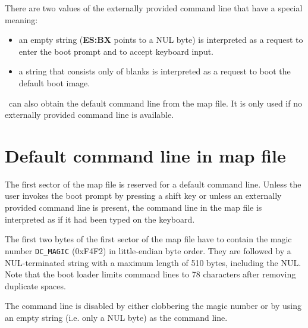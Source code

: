 There are two values of the externally provided command line that have a
special meaning:

\begin{itemize}
  \item an empty string ({\bf ES:BX} points to a NUL byte) is interpreted
    as a request to enter the boot prompt and to accept keyboard input.
  \item a string that consists only of blanks is interpreted as a request
    to boot the default boot image.
\end{itemize}

\LILO\ can also obtain the default command line from the map file. It
is only used if no externally provided command line is available.


\section{Default command line in map file}

The first sector of the map file is reserved for a default command line.
Unless the user invokes the boot prompt by pressing a shift key or unless an
externally provided command line is present, the command line in the map
file is interpreted as if it had been typed on the keyboard.

The first two bytes of the first sector of the map file have to contain
the magic number {\tt DC\_MAGIC} (0xF4F2) in little-endian byte order.
They are followed by a NUL-terminated string with a maximum length of
510 bytes, including the NUL. Note that the boot loader limits command
lines to 78 characters after removing duplicate spaces.

The command line is disabled by either clobbering the magic number or
by using an empty string (i.e. only a NUL byte) as the command line.


